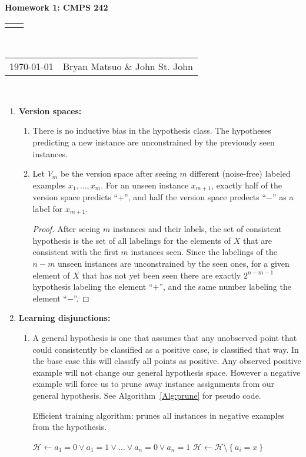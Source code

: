 \documentclass[12pt]{article}
\renewcommand{\title}[1]{\textbf{#1}\\}
\renewcommand{\line}{\begin{tabularx}{\textwidth}{X>{\raggedleft}X}\hline\\\end{tabularx}\\[-0.5cm]}
\newcommand{\leftright}[2]{\begin{tabularx}{\textwidth}{X>{\raggedleft}X}#1%
& #2\\\end{tabularx}\\[-0.5cm]}
\begin{document}
\title{Homework 1: CMPS 242}
\line
\leftright{\today}{Bryan Matsuo \& John St. John} %
\begin{enumerate}
\item \textbf{Version spaces: }

\begin{enumerate}
\item There is no inductive bias in the hypothesis class. The hypotheses predicting a new instance are unconstrained by the previously seen instances.
\item 
Let $V_m$ be the version space after seeing $m$ different (noise-free) labeled examples $x_1, \dots, x_m$. For an unseen instance $x_{m+1}$, exactly half of the version space predicts ``$+$'', and half the version space predects ``$-$'' as a label for $x_{m+1}$.

\begin{proof}
    After seeing $m$ instances and their labels, the set of consistent hypothesis is the set of all labelings for the elements of $X$ that are consistent with the first $m$ instances seen. Since the labelings of the $n-m$ unseen instances are unconstrained by the seen ones, for a given element of $X$ that has not yet been seen there are exactly $2^{n-m-1}$ hypothesis labeling the element ``$+$'', and the same number labeling the element ``$-$''.
\end{proof}

\end{enumerate}
\item \textbf{ Learning disjunctions: }

\begin{enumerate}
\item A general hypothesis is one that assumes that any unobserved point
that could consistently be classified as a positive case, is classified
that way. In the base case this will classify all points as positive.
Any observed positive example will not change our general hypothesis
space. However a negative example will force us to prune away instance
assignments from our general hypothesis. See Algorithm~\ref{Alg:prune} for pseudo code.
\begin{algorithm}
\caption{Efficient training algorithm: prunes all instances in negative examples from the hypothesis. }
\label{Alg:prune}
\begin{algorithmic}
\STATE $\mathcal{H} \gets a_1=0 \vee a_1=1 \vee \ldots \vee a_n=0 \vee a_n=1$
			\STATE $\mathcal{H} \gets \mathcal{H} \setminus \left\{a_i=x\right\}$
		\ENDFOR
	\ENDIF
\ENDFOR
\end{algorithmic}
\end{algorithm}


\end{enumerate}
\end{enumerate}
\end{document}
